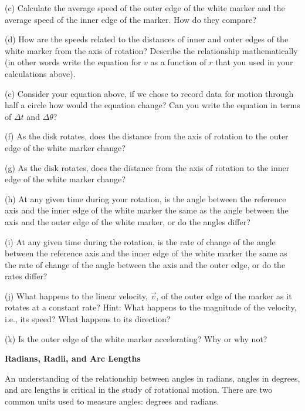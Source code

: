 (c) Calculate the average speed of the outer edge of the white marker and the
average speed of the inner edge of the marker. How do they compare?
\answerspace{20mm}

(d) How are the speeds related to the distances of inner and
outer edges of the white marker from the axis of rotation? Describe the
relationship mathematically (in other words write the equation for $v$ as a function of $r$ that you used in your calculations above).
\answerspace{15mm}

\pagebreak[3]

(e) Consider your equation above, if we chose to record data for motion through half a circle how would the equation change?  Can you write the equation in terms of  $\Delta t$ and $\Delta  \theta$?  
\answerspace{10mm}

(f) As the disk rotates, does the distance from the axis of rotation to the outer edge of the white marker change?
\answerspace{10mm}

(g) As the disk rotates, does the distance from the axis of rotation to the inner edge of the white marker change?
\answerspace{10mm}

(h) At any given time during your rotation, is the angle between the reference
axis and the inner edge of the white marker the same as the angle between the
axis and the outer edge of the white marker, or do the angles differ?
\answerspace{10mm}

(i) At any given time during the rotation, is the rate of change of the angle
between the reference axis and the inner edge of the white marker the same as
the rate of change of the angle between the axis and the outer edge, or do the
rates differ?
\answerspace{10mm}

(j) What happens to the linear velocity, $\vec{v}$, of the outer edge of the
marker as it rotates at a constant rate? Hint: What happens to the magnitude
of the velocity, i.e., its speed? What happens to its direction?
\answerspace{20mm}

(k) Is the outer edge of the white marker accelerating? Why or why not?
\answerspace{20mm}

\textbf{Radians, Radii, and Arc Lengths} 

An understanding of the relationship between angles in radians, angles in degrees, and arc lengths is critical in the study of rotational motion. There are two
common units used to measure angles: degrees and radians.

